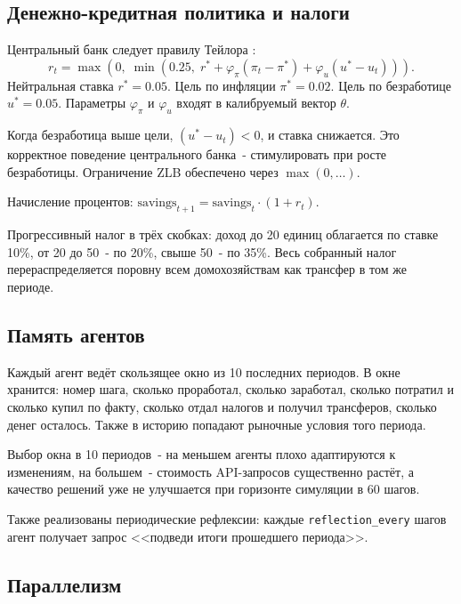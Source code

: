 \documentclass[12pt, a4paper]{article}
\begin{document}
\subsection{Денежно-кредитная политика и налоги}

Центральный банк следует правилу Тейлора \cite{taylor1993}:
\begin{equation}
r_t = \max\!\left(0,\; \min\!\left(0.25,\; r^* + \varphi_{\pi}(\pi_t - \pi^*) + \varphi_u(u^* - u_t)\right)\right).
\end{equation}
Нейтральная ставка $r^* = 0.05$. Цель по инфляции $\pi^* = 0.02$. Цель по безработице $u^* = 0.05$. Параметры $\varphi_{\pi}$ и $\varphi_u$ входят в калибруемый вектор $\theta$.

Когда безработица выше цели, $(u^* - u_t) < 0$, и ставка снижается. Это корректное поведение центрального банка~- стимулировать при росте безработицы. Ограничение ZLB обеспечено через $\max(0, \ldots)$.

Начисление процентов: $\text{savings}_{t+1} = \text{savings}_t \cdot (1 + r_t)$.

Прогрессивный налог в трёх скобках: доход до 20 единиц облагается по ставке 10\%, от 20 до 50~- по 20\%, свыше 50~- по 35\%. Весь собранный налог перераспределяется поровну всем домохозяйствам как трансфер в том же периоде.

\subsection{Память агентов}

Каждый агент ведёт скользящее окно из 10 последних периодов. В окне хранится: номер шага, сколько проработал, сколько заработал, сколько потратил и сколько купил по факту, сколько отдал налогов и получил трансферов, сколько денег осталось. Также в историю попадают рыночные условия того периода.

Выбор окна в 10 периодов~- на меньшем агенты плохо адаптируются к изменениям, на большем~- стоимость API-запросов существенно растёт, а качество решений уже не улучшается при горизонте симуляции в 60 шагов.

Также реализованы периодические рефлексии: каждые \texttt{reflection\_every} шагов агент получает запрос <<подведи итоги прошедшего периода>>.

\subsection{Параллелизм}
\end{document}
